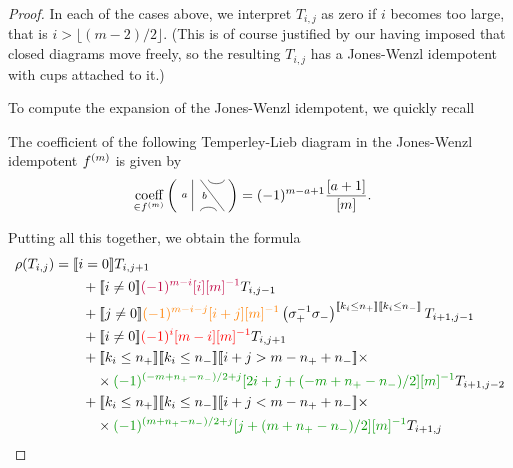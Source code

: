 \documentclass[12pt]{article}
\begin{document}
\begin{proof}
In each of the cases above, we interpret $T_{i,j}$ as zero if $i$ becomes too large, that is $i > \lfloor (m-2)/2 \rfloor$. (This is of course justified by our having imposed that closed diagrams move freely, so the resulting $T_{i,j}$ has a Jones-Wenzl idempotent with cups attached to it.)

To compute the expansion of the Jones-Wenzl idempotent, we quickly recall
\begin{lem}
The coefficient of the following Temperley-Lieb diagram in the Jones-Wenzl idempotent $f^{(m)}$ is given by
\begin{align*}
\underset{\in \jw{m}}{\textrm{coeff}}
\left(
\begin{tikzpicture}[baseline = -.1cm, yscale=-.5]
	\draw (-.5,-.8)--(-.5,.8);
	\draw (-.3,.8) arc (-180:0:.2cm);
	\draw (-.3,-.8)--(.3,.8);
	\draw (-.1,-.8) arc (180:0:.2cm);
	\node at (-.7,0) {{\scriptsize{$a$}}};
	\node at (-.2,0) {{\scriptsize{$b$}}};
    \node at (.2,0) {$\phantom{c}$};
\end{tikzpicture}
\right)
& =
(-1)^{m-a+1}\frac{[a+1]}{[m]}.
\end{align*}
\end{lem}

 
Putting all this together, we obtain the formula
\begin{align*}
\rho(T_{i,j}) & =
\truth{i = 0} T_{i, j + 1} \\
& \qquad +
\truth{i \neq 0} \textcolor{purple}{(-1)^{m-i} [i][m]^{-1}} T_{i,j-1} \\
& \qquad +
\truth{j \neq 0}\textcolor{orange}{(-1)^{m-i-j} [i+j][m]^{-1}} \left(\sigma_+^{-1} \sigma_-\right)^{\truth{k_i \leq n_+} \truth{k_i \leq n_-}} T_{i+1, j-1} \\
& \qquad +
\truth{i \neq 0}\textcolor{red}{(-1)^{i}  [m-i][m]^{-1}} T_{i, j + 1} \\
& \qquad +
\truth{k_i \leq n_+} \truth{k_i \leq n_-}
\truth{i+j > m - n_+ + n_-} \times \\
& \qquad \quad \times \textcolor{DarkGreen}{(-1)^{(-m + n_+ - n_-)/2 + j} [2i + j + (-m + n_+ - n_-)/2][m]^{-1}} T_{i+1,j-2} \\
& \qquad +
\truth{k_i \leq n_+} \truth{k_i \leq n_-}
\truth{i+j < m - n_+ + n_-} \times \\
& \qquad \quad \times \textcolor{DarkGreen}{(-1)^{(m + n_+ - n_-)/2 + j} [j+ (m + n_+ - n_-)/2 ][m]^{-1}} T_{i+1,j}
\end{align*}


\end{proof}
\end{document}
